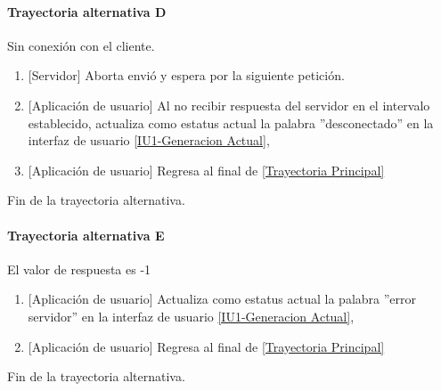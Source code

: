 \paragraph{Trayectoria alternativa D} \label{SUB-U-CU1.13:TD}
	Sin conexión con el cliente.
	\begin{enumerate}[label=D\arabic*.]
		\item {[Servidor]} Aborta envió y espera por la siguiente petición.
		\item {[Aplicación de usuario]} Al no recibir respuesta del servidor en el intervalo establecido, actualiza como estatus actual la palabra ''desconectado'' en la interfaz de usuario \hyperref[fig:monitoreo]{[IU1-Generacion Actual]},
		\item {[Aplicación de usuario]} Regresa al final de \hyperref[SUB-U-CU1.13:TP]{[Trayectoria Principal]}
	\end{enumerate}
	Fin de la trayectoria alternativa.
	
\paragraph{Trayectoria alternativa E} \label{SUB-U-CU1.13:TE}
	El valor de respuesta es -1
	\begin{enumerate}[label=E\arabic*.]
		\item {[Aplicación de usuario]} Actualiza como estatus actual la palabra ''error servidor'' en la interfaz de usuario \hyperref[fig:monitoreo]{[IU1-Generacion Actual]},
		\item {[Aplicación de usuario]} Regresa al final de \hyperref[SUB-U-CU1.13:TP]{[Trayectoria Principal]}
	\end{enumerate}
	Fin de la trayectoria alternativa.

